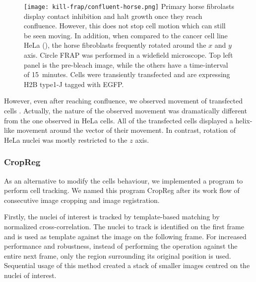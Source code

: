       \begin{figure}
        \centering
        \texttt{[image: kill-frap/confluent-horse.png]}
          {
            Primary horse fibrolasts display contact inhibition and halt growth
            once they reach confluence. However, this does not stop cell
            motion which can still be seen moving. In addition, when compared
            to the cancer cell line HeLa (),
            the horse fibroblasts frequently rotated around the $x$ and $y$
            axis. Circle FRAP was performed in a widefield microscope.
            Top left panel is the pre-bleach image, while the others have a
            time-interval of 15~minutes. Cells were transiently transfected
            and are expressing H2B type1-J tagged with EGFP.
          }
        \label{fig:kill-frap:confluent-horse}
      \end{figure}

      However, even after reaching confluence, we observed movement of
      transfected cells . Actually,
      the nature of the observed movement was dramatically different from
      the one observed in HeLa cells. All of the transfected cells displayed
      a helix-like movement around the vector of their movement.
      In contrast, rotation of HeLa nuclei was mostly restricted to the
      $z$ axis.

    \subsubsection{CropReg}

      As an alternative to modify the cells behaviour, we implemented a program
      to perform cell tracking. We named this program CropReg
      after its work flow of consecutive image cropping and image registration.

      Firstly, the nuclei of interest is tracked by template-based matching
      by normalized cross-correlation. The nuclei to track
      is identified on the first frame and is used as template against the
      image on the following frame. For increased performance and robustness,
      instead of performing the operation against the entire next frame, only
      the region surrounding its original position is used. Sequential
      usage of this method created a stack of smaller images centred on
      the nuclei of interest.

